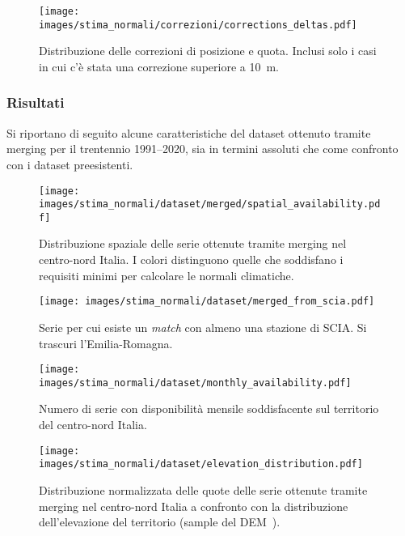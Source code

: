 \begin{figure}[ht]
  \centering
  \texttt{[image: images/stima\_normali/correzioni/corrections\_deltas.pdf]}
  \caption{Distribuzione delle correzioni di posizione e quota. Inclusi solo i casi in cui c'è stata una correzione superiore a \qty{10}{\meter}.}\label{fig:corrections-deltas}
\end{figure}



\subsubsection{Risultati}\label{ch:results}
Si riportano di seguito alcune caratteristiche del dataset ottenuto tramite merging per il trentennio 1991--2020, sia in termini assoluti che come confronto con i dataset preesistenti.

\begin{figure}[ht]
  \centering
  \texttt{[image: images/stima\_normali/dataset/merged/spatial\_availability.pdf]}
  \caption{Distribuzione spaziale delle serie ottenute tramite merging nel centro-nord Italia. I colori distinguono quelle che soddisfano i requisiti minimi per calcolare le normali climatiche.}\label{fig:merged-stations}
\end{figure}

\begin{figure}[ht]
  \centering
  \texttt{[image: images/stima\_normali/dataset/merged\_from\_scia.pdf]}
  \caption{Serie per cui esiste un \emph{match} con almeno una stazione di SCIA. Si trascuri l'Emilia-Romagna.}\label{fig:merged-fromscia}
\end{figure}

\begin{figure}[ht]
  \centering
  \texttt{[image: images/stima\_normali/dataset/monthly\_availability.pdf]}
  \caption{Numero di serie con disponibilità mensile soddisfacente sul territorio del centro-nord Italia.}\label{fig:merged-timeseries}
\end{figure}

\begin{figure}[ht]
  \centering
  \texttt{[image: images/stima\_normali/dataset/elevation\_distribution.pdf]}
  \caption{Distribuzione normalizzata delle quote delle serie ottenute tramite merging nel centro-nord Italia a confronto con la distribuzione dell'elevazione del territorio (sample del DEM~\cite{europeanspaceagencyCopernicusGlobalEuropean2022}).}\label{fig:merged-elevations}
\end{figure}

